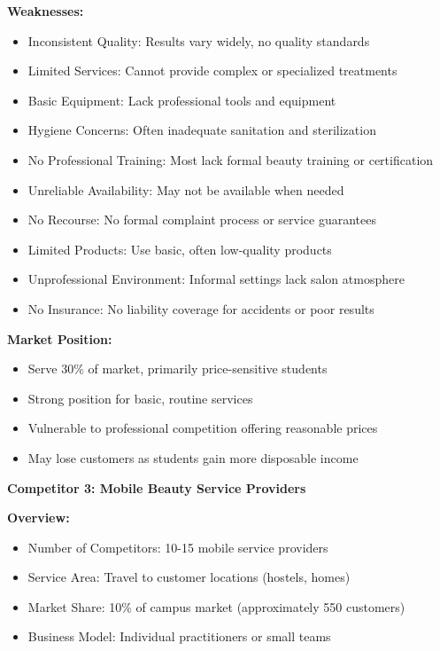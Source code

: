 \documentclass[a4paper,12pt]{article}
\begin{document}
\textbf{Weaknesses:}
\begin{itemize}[leftmargin=2em]
    \item Inconsistent Quality: Results vary widely, no quality standards
    \item Limited Services: Cannot provide complex or specialized treatments
    \item Basic Equipment: Lack professional tools and equipment
    \item Hygiene Concerns: Often inadequate sanitation and sterilization
    \item No Professional Training: Most lack formal beauty training or certification
    \item Unreliable Availability: May not be available when needed
    \item No Recourse: No formal complaint process or service guarantees
    \item Limited Products: Use basic, often low-quality products
    \item Unprofessional Environment: Informal settings lack salon atmosphere
    \item No Insurance: No liability coverage for accidents or poor results
\end{itemize}

\textbf{Market Position:}
\begin{itemize}[leftmargin=2em]
    \item Serve 30\% of market, primarily price-sensitive students
    \item Strong position for basic, routine services
    \item Vulnerable to professional competition offering reasonable prices
    \item May lose customers as students gain more disposable income
\end{itemize}

\vspace{1em}

\textbf{Competitor 3: Mobile Beauty Service Providers}

\textbf{Overview:}
\begin{itemize}[leftmargin=2em]
    \item Number of Competitors: 10-15 mobile service providers
    \item Service Area: Travel to customer locations (hostels, homes)
    \item Market Share: 10\% of campus market (approximately 550 customers)
    \item Business Model: Individual practitioners or small teams
\end{itemize}
\end{document}
